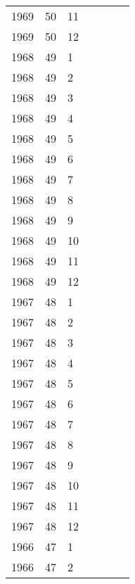 \begin{longtable}{ |l|l|l|l|p{2.7cm}|l|p{2cm}| }
 1969 & 50 &    11 &         &                &  & \\
 1969 & 50 &    12 &         &                &  & \\
 1968 & 49 &     1 &         &                &  & \\
 1968 & 49 &     2 &         &                &  & \\
 1968 & 49 &     3 &         &                &  & \\
 1968 & 49 &     4 &         &                &  & \\
 1968 & 49 &     5 &         &                &  & \\
 1968 & 49 &     6 &         &                &  & \\
 1968 & 49 &     7 &         &                &  & \\
 1968 & 49 &     8 &         &                &  & \\
 1968 & 49 &     9 &         &                &  & \\
 1968 & 49 &    10 &         &                &  & \\
 1968 & 49 &    11 &         &                &  & \\
 1968 & 49 &    12 &         &                &  & \\
 1967 & 48 &     1 &         &                &  & \\
 1967 & 48 &     2 &         &                &  & \\
 1967 & 48 &     3 &         &                &  & \\
 1967 & 48 &     4 &         &                &  & \\
 1967 & 48 &     5 &         &                &  & \\
 1967 & 48 &     6 &         &                &  & \\
 1967 & 48 &     7 &         &                &  & \\
 1967 & 48 &     8 &         &                &  & \\
 1967 & 48 &     9 &         &                &  & \\
 1967 & 48 &    10 &         &                &  & \\
 1967 & 48 &    11 &         &                &  & \\
 1967 & 48 &    12 &         &                &  & \\
 1966 & 47 &     1 &         &                &  & \\
 1966 & 47 &     2 &         &                &  & \\

\end{longtable}
